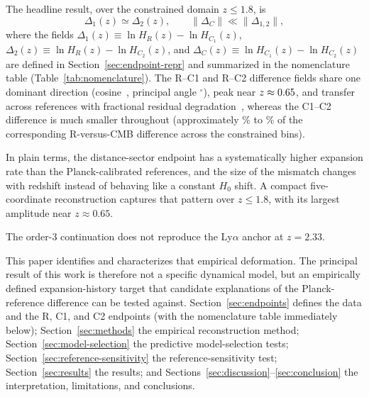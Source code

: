 The headline result, over the constrained domain $z\le1.8$, is
\[
\Delta_{1}(z) \simeq \Delta_{2}(z),
\qquad
\|\Delta_{C}\| \ll \|\Delta_{1,2}\|,
\]
where the fields
$\Delta_{1}(z)\equiv\ln H_{R}(z)-\ln H_{C_{1}}(z)$,
$\Delta_{2}(z)\equiv\ln H_{R}(z)-\ln H_{C_{2}}(z)$, and
$\Delta_{C}(z)\equiv\ln H_{C_{1}}(z)-\ln H_{C_{2}}(z)$
are defined in Section~\ref{sec:endpoint-repr} and summarized in the
nomenclature table (Table~\ref{tab:nomenclature}).
The R–C1 and R–C2 difference fields share one dominant direction
(cosine~\GeometryCosineSimilarity{}, principal angle
\GeometryPrincipalAngle$^{\circ}$), peak near
$z\approx0.65{}$, and transfer across references with
fractional residual degradation~\GeometryTransferDegradation{},
whereas the C1–C2 difference is much smaller
throughout (approximately \ReferenceSensitivityRatioMinPct{}\% to \ReferenceSensitivityRatioMaxPct{}\% of the corresponding R-versus-CMB difference across the
constrained bins).

In plain terms, the distance-sector endpoint has a systematically higher expansion rate than the Planck-calibrated references, and the size of the mismatch changes with redshift instead of behaving like a constant $H_0$ shift. A compact five-coordinate reconstruction captures that pattern over $z\le1.8$, with its largest amplitude near $z\approx0.65$.

The order-3 continuation does not reproduce the Ly$\alpha$ anchor at $z=2.33$.

This paper identifies and characterizes that empirical deformation.
The principal result of this work is therefore not a specific
dynamical model, but an empirically defined expansion-history target
that candidate explanations of the Planck-reference difference can be
tested against.
Section~\ref{sec:endpoints} defines the data and the R, C1, and C2
endpoints (with the nomenclature table immediately below);
Section~\ref{sec:methods} the empirical reconstruction method;
Section~\ref{sec:model-selection} the predictive model-selection tests;
Section~\ref{sec:reference-sensitivity} the reference-sensitivity test;
Section~\ref{sec:results} the results;
and Sections~\ref{sec:discussion}--\ref{sec:conclusion} the
interpretation, limitations, and conclusions.
